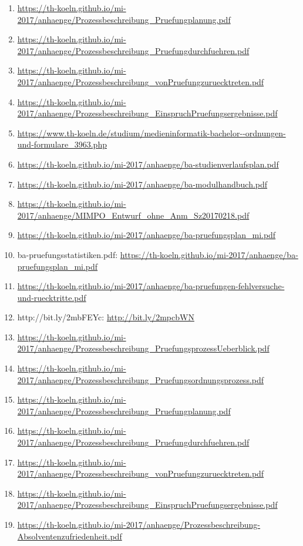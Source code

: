 \documentclass[BCOR12mm,DIV11,titlepage,a4paper,oneside,10pt]{scrbook}
\begin{document}
\begin{sloppypar}
\begin{flushleft}
\begin{enumerate}
\item{\url{https://th-koeln.github.io/mi-2017/anhaenge/Prozessbeschreibung\_Pruefungplanung.pdf}} 
\item{\url{https://th-koeln.github.io/mi-2017/anhaenge/Prozessbeschreibung\_Pruefungdurchfuehren.pdf}} 
\item{\url{https://th-koeln.github.io/mi-2017/anhaenge/Prozessbeschreibung\_vonPruefungzuruecktreten.pdf}} 
\item{\url{https://th-koeln.github.io/mi-2017/anhaenge/Prozessbeschreibung\_EinspruchPruefungsergebnisse.pdf}} 
\item{\url{https://www.th-koeln.de/studium/medieninformatik-bachelor--ordnungen-und-formulare\_3963.php}} 
\item{\url{https://th-koeln.github.io/mi-2017/anhaenge/ba-studienverlaufsplan.pdf}} 
\item{\url{https://th-koeln.github.io/mi-2017/anhaenge/ba-modulhandbuch.pdf}} 
\item{\url{https://th-koeln.github.io/mi-2017/anhaenge/MIMPO\_Entwurf\_ohne\_Anm\_Sz20170218.pdf}} 
\item{\url{https://th-koeln.github.io/mi-2017/anhaenge/ba-pruefungsplan\_mi.pdf}} 
\item{ba-pruefungsstatistiken.pdf: \url{https://th-koeln.github.io/mi-2017/anhaenge/ba-pruefungsplan\_mi.pdf} } 
\item{\url{https://th-koeln.github.io/mi-2017/anhaenge/ba-pruefungen-fehlversuche-und-ruecktritte.pdf}} 
\item{http://bit.ly/2mbFEYc: \url{http://bit.ly/2mpcbWN} } 
\item{\url{https://th-koeln.github.io/mi-2017/anhaenge/Prozessbeschreibung\_PruefungsprozessUeberblick.pdf}} 
\item{\url{https://th-koeln.github.io/mi-2017/anhaenge/Prozessbeschreibung\_Pruefungsordnungsprozess.pdf}} 
\item{\url{https://th-koeln.github.io/mi-2017/anhaenge/Prozessbeschreibung\_Pruefungplanung.pdf}} 
\item{\url{https://th-koeln.github.io/mi-2017/anhaenge/Prozessbeschreibung\_Pruefungdurchfuehren.pdf}} 
\item{\url{https://th-koeln.github.io/mi-2017/anhaenge/Prozessbeschreibung\_vonPruefungzuruecktreten.pdf}} 
\item{\url{https://th-koeln.github.io/mi-2017/anhaenge/Prozessbeschreibung\_EinspruchPruefungsergebnisse.pdf}} 
\item{\url{https://th-koeln.github.io/mi-2017/anhaenge/Prozessbeschreibung-Absolventenzufriedenheit.pdf}} 

\end{enumerate}
\end{flushleft}
\end{sloppypar}
\end{document}
